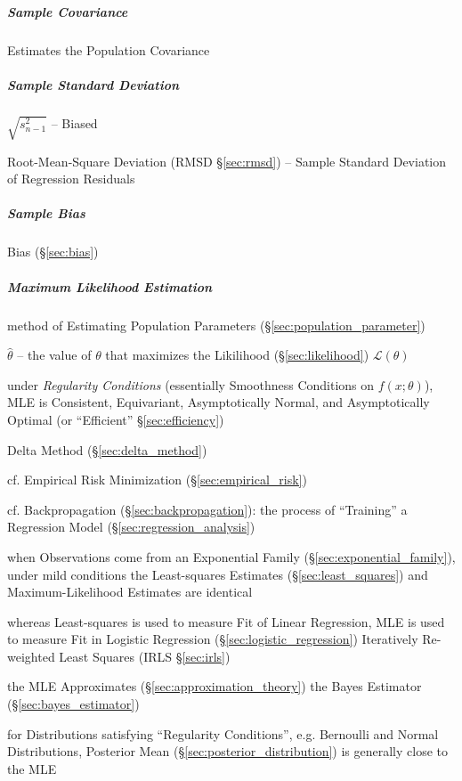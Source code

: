 \subparagraph{Sample Covariance}\label{sec:sample_covariance}\hfill

Estimates the Population Covariance



\subparagraph{Sample Standard Deviation}
\label{sec:sample_standard_deviation}\hfill

$\sqrt{s^2_{n-1}}$ -- Biased

\fist Root-Mean-Square Deviation (RMSD \S\ref{sec:rmsd}) -- Sample Standard
Deviation of Regression Residuals



\subparagraph{Sample Bias}\label{sec:sample_bias}\hfill

Bias (\S\ref{sec:bias})



\subparagraph{Maximum Likelihood Estimation}\label{sec:mle}\hfill

method of Estimating Population Parameters (\S\ref{sec:population_parameter})

$\hat{\theta}$ -- the value of $\theta$ that maximizes the Likilihood
(\S\ref{sec:likelihood}) $\mathcal{L}(\theta)$

under \emph{Regularity Conditions} (essentially Smoothness Conditions on
$f(x; \theta)$), MLE is Consistent, Equivariant, Asymptotically Normal, and
Asymptotically Optimal (or ``Efficient'' \S\ref{sec:efficiency})

\fist Delta Method (\S\ref{sec:delta_method})

cf. Empirical Risk Minimization (\S\ref{sec:empirical_risk})

cf. Backpropagation (\S\ref{sec:backpropagation}): the process of ``Training'' a
Regression Model (\S\ref{sec:regression_analysis})

when Observations come from an Exponential Family
(\S\ref{sec:exponential_family}), under mild conditions the Least-squares
Estimates (\S\ref{sec:least_squares}) and Maximum-Likelihood Estimates are
identical

whereas Least-squares is used to measure Fit of Linear Regression, MLE is used
to measure Fit in Logistic Regression (\S\ref{sec:logistic_regression}) \fist
Iteratively Re-weighted Least Squares (IRLS \S\ref{sec:irls})

the MLE Approximates (\S\ref{sec:approximation_theory}) the Bayes Estimator
(\S\ref{sec:bayes_estimator})

for Distributions satisfying ``Regularity Conditions'', e.g. Bernoulli and
Normal Distributions, Posterior Mean (\S\ref{sec:posterior_distribution}) is
generally close to the MLE

